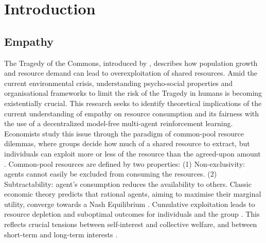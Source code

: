 \section{Introduction}
\subsection{Empathy}
The Tragedy of the Commons, introduced by \cite{hardinTragedyCommonsPopulation1968}, describes how population growth and resource demand can lead to overexploitation of shared resources. Amid the current environmental crisis, understanding psycho-social properties and organisational frameworks to limit the risk of the Tragedy in humans is becoming existentially crucial. This research seeks to identify theoretical implications of the current understanding of empathy on resource consumption and its fairness with the use of a decentralized model-free multi-agent reinforcement learning.
Economists study this issue through the paradigm of common-pool resource dilemmas, where groups decide how much of a shared resource to extract, but individuals can exploit more or less of the resource than the agreed-upon amount \cite{patelModellingCooperationCompetition2021}. Common-pool resources are defined by two properties\cite{ostromRevisitingCommonsLocal1999,perolatMultiagentReinforcementLearning2017}: 
(1) Non-exclusivity: agents cannot easily be excluded from consuming the resources. 
(2) Subtractability: agent’s consumption reduces the availability to others.
Classic economic theory predicts that rational agents, aiming to maximise their marginal utility, converge towards a Nash Equilibrium \cite{nashEquilibriumPointsPerson1950}. Cumulative exploitation leads to resource depletion and suboptimal outcomes for individuals and the group \cite{patelModellingCooperationCompetition2021}. This reflects crucial tensions between self-interest and collective welfare, and between short-term and long-term interests \cite{vanlangeHowWeCan2008}. 


